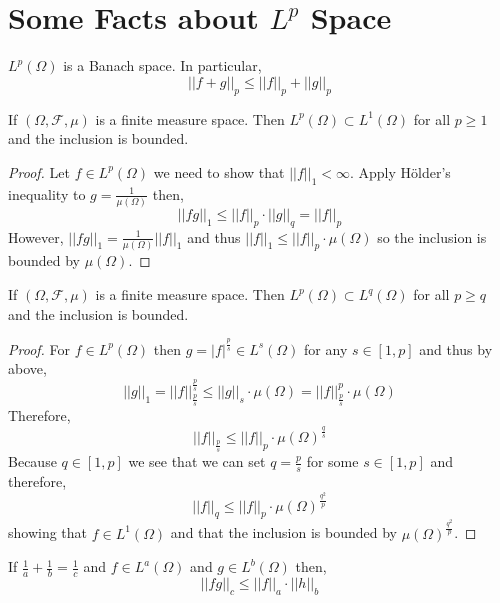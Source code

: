 \documentclass[12pt]{article}
\renewcommand{\F}{\mathcal{F}}
\begin{document}
\section{Some Facts about $L^p$ Space}

\begin{prop}[Minkowski]
$L^p(\Omega)$ is a Banach space. In particular,
\[ || f + g ||_p \le || f ||_p + || g ||_p \]
\end{prop}

\begin{prop}
If $(\Omega, \F, \mu)$ is a finite measure space. Then $L^p(\Omega) \subset L^1(\Omega)$ for all $p \ge 1$ and the inclusion is bounded.
\end{prop}

\begin{proof}
Let $f \in L^p(\Omega)$ we need to show that $|| f ||_1 < \infty$. Apply H\"{o}lder's inequality to $g = \frac{1}{\mu(\Omega)}$ then,
\[ || fg ||_1 \le || f ||_p \cdot || g ||_q = || f ||_p \]
However, $|| f g ||_1 = \frac{1}{\mu(\Omega)} || f ||_1$ and thus $|| f ||_1 \le || f ||_p \cdot \mu(\Omega)$ so the inclusion is bounded by $\mu(\Omega)$.
\end{proof}

\begin{cor}
If $(\Omega, \F, \mu)$ is a finite measure space. Then $L^p(\Omega) \subset L^q(\Omega)$ for all $p \ge q$ and the inclusion is bounded.
\end{cor}

\begin{proof}
For $f \in L^p(\Omega)$ then $g = |f|^{\frac{p}{s}} \in L^s(\Omega)$ for any $s \in [1, p]$ and thus by above,
\[ || g ||_1 = || f ||_{\frac{p}{s}}^{\frac{p}{s}} \le || g ||_s \cdot \mu(\Omega) = || f ||_{\frac{p}{s}}^p \cdot \mu(\Omega) \]
Therefore, 
\[ || f ||_{\frac{p}{s}} \le || f ||_p \cdot \mu(\Omega)^{\frac{q}{s}} \]
Because $q \in [1, p]$ we see that we can set $q = \frac{p}{s}$ for some $s \in [1, p]$ and therefore,
\[ || f ||_q \le || f ||_p \cdot \mu(\Omega)^{\frac{q^2}{p}} \]
showing that $f \in L^1(\Omega)$ and that the inclusion is bounded by $\mu(\Omega)^{\frac{q^2}{p}}$.
\end{proof}

\begin{prop}
If $\frac{1}{a} + \frac{1}{b} = \frac{1}{c}$ and $f \in L^a(\Omega)$ and $g \in L^b(\Omega)$ then,
\[ || fg ||_c \le || f ||_a \cdot || h ||_b \]
\end{prop}
\end{document}
